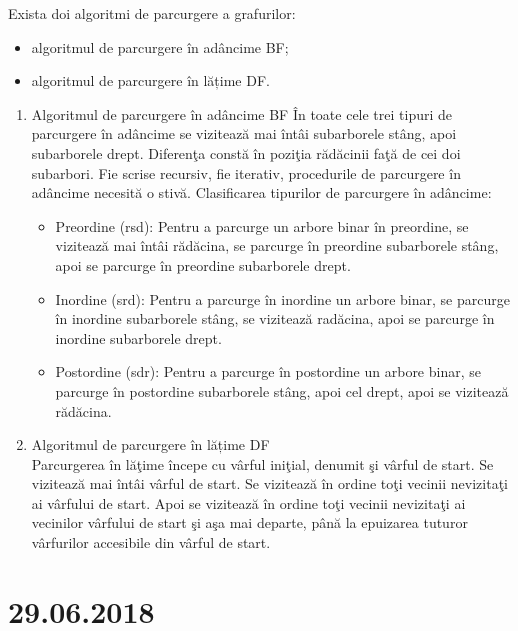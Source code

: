 \documentclass{report}
\begin{document}
Exista doi algoritmi de parcurgere  a grafurilor:
\begin{itemize}
\item algoritmul de parcurgere în adâncime BF;
\item algoritmul de parcurgere în lățime DF.
\end{itemize}
\begin{enumerate}
\item    Algoritmul de parcurgere în adâncime BF \newline
În toate cele trei tipuri de parcurgere în adâncime se vizitează mai întâi subarborele stâng, apoi subarborele drept. Diferenţa constă în poziţia rădăcinii faţă de cei doi subarbori. Fie scrise recursiv, fie iterativ, procedurile de parcurgere în adâncime necesită o stivă.
              Clasificarea tipurilor de parcurgere în adâncime:
              \begin{itemize}
             \item Preordine (rsd):
             Pentru a parcurge un arbore binar în preordine, se vizitează mai întâi rădăcina, se parcurge în preordine subarborele stâng, apoi se parcurge în preordine subarborele drept.
            \item Inordine (srd):
            Pentru a parcurge în inordine un arbore binar, se parcurge în inordine subarborele stâng, se vizitează radăcina, apoi se parcurge în inordine subarborele drept.

            \item Postordine (sdr):
            Pentru a parcurge în postordine un arbore binar, se parcurge în postordine subarborele stâng, apoi cel drept, apoi se vizitează rădăcina.

\end{itemize}
\item Algoritmul de parcurgere în lățime DF \\
 Parcurgerea în lăţime începe cu vârful iniţial, denumit şi vârful de start. Se vizitează mai întâi vârful de start. Se vizitează în ordine toţi vecinii nevizitaţi ai vârfului de start.  Apoi se vizitează în ordine toţi vecinii nevizitaţi ai vecinilor vârfului de start şi aşa mai departe, până la epuizarea tuturor vârfurilor accesibile din vârful de start.
\end{enumerate}

\chapter{29.06.2018}
\end{document}
